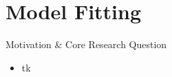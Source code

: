 \section{Model Fitting}

\begin{frame}{Motivation \& Core Research Question}
  \begin{itemize}
    \item tk
  \end{itemize}
\end{frame}